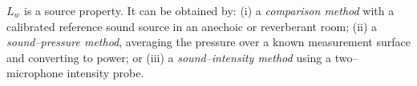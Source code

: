 
\(L_w\) is a source property. It can be obtained by:
(i) a \emph{comparison method} with a calibrated reference sound source in an anechoic or reverberant room;
(ii) a \emph{sound–pressure method}, averaging the pressure over a known measurement surface and converting to power; or
(iii) a \emph{sound–intensity method} using a two–microphone intensity probe.





